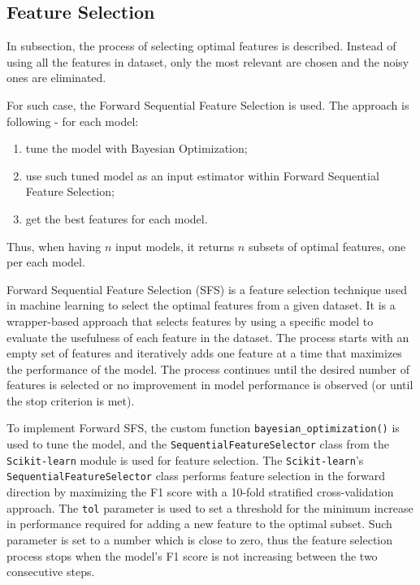 \subsection{Feature Selection}
\label{subsec:feature-selection}

In subsection, the process of selecting optimal features is described. Instead of using all the features in dataset, only the most relevant are chosen and the noisy ones are eliminated.

For such case, the Forward Sequential Feature Selection is used. The approach is following - for each model:

\begin{enumerate}\setlength\itemsep{0em}
    \item tune the model with Bayesian Optimization;
    \item use such tuned model as an input estimator within Forward Sequential Feature Selection;
    \item get the best features for each model.
\end{enumerate}

Thus, when having $n$ input models, it returns $n$  subsets of optimal features, one per each model.

Forward Sequential Feature Selection (SFS) is a feature selection technique used in machine learning to select the optimal features from a given dataset.
It is a wrapper-based approach that selects features by using a specific model to evaluate the usefulness of each feature in the dataset.
The process starts with an empty set of features and iteratively adds one feature at a time that maximizes the performance of the model.
The process continues until the desired number of features is selected or no improvement in model performance is observed (or until the stop criterion is met).


To implement Forward SFS, the custom function \lstinline{bayesian_optimization()} is used to tune the model, and the \lstinline{SequentialFeatureSelector} class from the \lstinline{Scikit-learn} module is used for feature selection.
The \lstinline{Scikit-learn}'s \lstinline{SequentialFeatureSelector} class performs feature selection in the forward direction by maximizing the F1 score with a 10-fold stratified cross-validation approach.
The \lstinline{tol} parameter is used to set a threshold for the minimum increase in performance required for adding a new feature to the optimal subset.
Such parameter is set to a number which is close to zero, thus the feature selection process stops when the model's F1 score is not increasing between the two consecutive steps.

